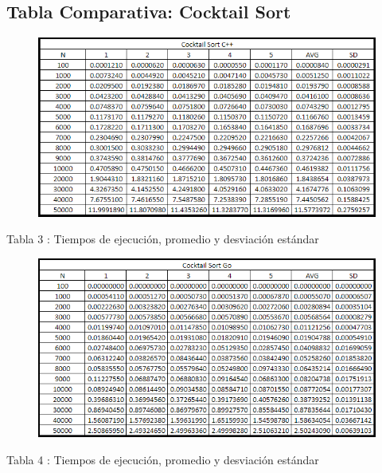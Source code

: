 \documentclass[https://www.overleaf.com/project/63761df255a8a9f4a15c3579
	letterpaper, %
	10pt, %
]{CSUniSchoolLabReport}
\begin{document}
\subsection{Tabla Comparativa: Cocktail Sort}

\begin{figure}[H] 
	\centering 
	\includegraphics[width=1\textwidth]{Figures/1.png} %
\end{figure}
\begin{center}
    Tabla 3 : Tiempos de ejecución, promedio y desviación estándar
\end{center}
 
\begin{figure}[H] 
	\centering 
	\includegraphics[width=1\textwidth]{Figures/2.png} %
\end{figure}
\begin{center}
    Tabla 4 : Tiempos de ejecución, promedio y desviación estándar
\end{center}
\end{document}
